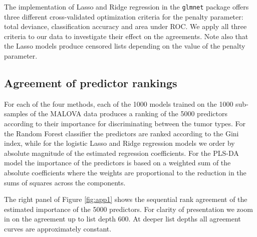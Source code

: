 \documentclass[12pt,a4paper]{article}
\theoremstyle{plain}
\begin{document}
The implementation of Lasso and Ridge regression in the
\texttt{glmnet} package offers three different cross-validated
optimization criteria for the penalty parameter: total deviance,
classification accuracy and area under ROC. We apply all three
criteria to our data to investigate their effect on the agreements.
Note also that the Lasso models produce censored lists depending on
the value of the penalty parameter.


\subsection{Agreement of predictor rankings}
For each of the four methods, each of the 1000 models trained on
the 1000 sub-samples of the MALOVA data produces a ranking of the 5000
predictors according to their importance for discriminating between
the tumor types. For the Random Forest classifier the predictors are ranked according
to the Gini index, while for the logistic Lasso and Ridge regression
models we order by absolute magnitude of the estimated
regression coefficients. For the PLS-DA model the importance of the
predictors is based on a weighted sum of the absolute coefficients
where the weights are proportional to the reduction in the sums of
squares across the components.

The right panel of Figure \ref{fig:app1} shows the sequential rank
agreement of the estimated importance of the 5000 predictors.  For
clarity of presentation we zoom in on the agreement up to list depth
600. At deeper list depths all agreement curves are approximately constant.
\end{document}
